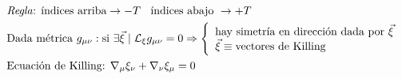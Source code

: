 \begin{align*}
    &\text{\textit{Regla}: índices arriba} \rightarrow - T \;\;\text{ índices abajo } \rightarrow + T\\
    &\text{Dada métrica } g_{\mu \nu}: \text{si } \exists \vec{\xi}  \;|\;\mathcal{ L}_\xi g_{\mu\nu}=0\Rightarrow 
    \left\{
    \begin{array}{l}
\text{hay simetría en dirección dada por }\vec{\xi}\\
\vec{\xi} \equiv \text{vectores de Killing}
\end{array}
\right.
\\
&\text{Ecuación de Killing: } \nabla_\mu \xi_\nu + \nabla_\nu  \xi_\mu =0
\end{align*}

